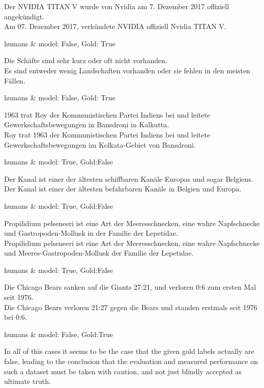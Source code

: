 \begin{examples}
  \item Der NVIDIA TITAN V wurde von Nvidia am 7. Dezember 2017 offiziell angekündigt.\\
        Am 07. Dezember 2017, verkündete NVIDIA offiziell Nvidia TITAN V.

        humans \& model: False, Gold: True
  \item Die Schäfte sind sehr kurz oder oft nicht vorhanden.\\
        Es sind entweder wenig Landschaften vorhanden oder sie fehlen in den meisten Fällen.

        humans \& model: False, Gold: True
  \item 1963 trat Roy der Kommunistischen Partei Indiens bei und leitete Gewerkschaftsbewegungen in Bansdroni in Kalkutta.\\
        Roy trat 1963 der Kommunistischen Partei Indiens bei und leitete Gewerkschaftsbewegungen im Kolkata-Gebiet von Bansdroni.

        humans \& model: True, Gold:False
  \item Der Kanal ist einer der ältesten schiffbaren Kanäle Europas und sogar Belgiens.\\
        Der Kanal ist einer der ältesten befahrbaren Kanäle in Belgien und Europa.

        humans \& model: True, Gold:False
  \item Propilidium pelseneeri ist eine Art der Meeresschnecken, eine wahre Napfschnecke und Gastropoden-Mollusk in der Familie der Lepetidae.\\
        Propilidium pelseneeri ist eine Art der Meeresschnecken, eine wahre Napfschnecke und Meeres-Gastropoden-Mollusk der Familie der Lepetidae.

        humans \& model: True, Gold:False
  \item Die Chicago Bears sanken auf die Giants 27:21, und verloren 0:6 zum ersten Mal seit 1976.\\
        Die Chicago Bears verloren 21:27 gegen die Bears und standen erstmals seit 1976 bei 0:6.

        humans \& model: False, Gold:True
\end{examples}

In all of this cases it seems to be the case that the given gold labels actually are false,
leading to the conclusion that the evaluation and measured performance on such a dataset must
be taken with caution, and not just blindly accepted as ultimate truth.


